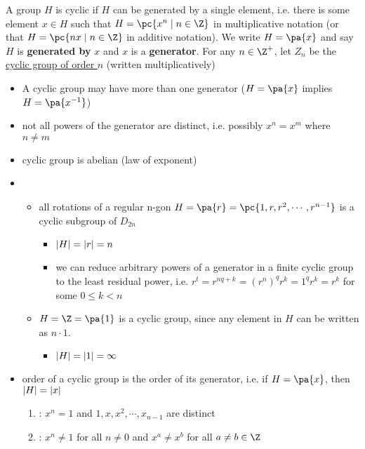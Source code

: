 \documentclass[11pt]{article}
\begin{document}
\begin{definition*}
     A group $H$ is cyclic if $H$ can be generated by a single element, i.e. there is some element $x\in H$ such that $H = \pc{x^n \mid n\in\Z}$ in multiplicative notation (or that $H=\pc{nx \mid n\in \Z}$ in additive notation). We write $H=\pa{x}$ and say $H$ is \textbf{generated by} $x$ and $x$ is a \textbf{generator}. For any $n\in\Z^+$, let $Z_n$ be the \underline{cyclic group of order $n$} (written multiplicatively)
    \begin{itemize}
        \item {} A cyclic group may have more than one generator ($H=\pa{x}$ implies $H=\pa{x^{-1}}$)
        \item {} not all powers of the generator are distinct, i.e. possibly $x^n = x^m$ where $n\neq m$
        \item {} cyclic group is abelian (law of exponent)
        \item {}
        \begin{itemize}
            \item all rotations of a regular n-gon $H=\pa{r} = \pc{1,r,r^2,\cdots,r^{n-1}}$ is a cyclic subgroup of $D_{2n}$ 
            \begin{itemize}
                \item $\left|H\right| = \left|r\right| = n$
                \item we can reduce arbitrary powers of a generator in a finite cyclic group to the least residual power, i.e. $r^t = r^{nq+k} = (r^n)^q r^k = 1^q r^k = r^k$ for some $0\leq k < n$
            \end{itemize}
            \item $H=\Z = \pa{1}$ is a cyclic group, since any element in $H$ can be written as $n\cdot 1$.
            \begin{itemize}
                \item $\left|H\right| = \left|1\right| = \infty$
            \end{itemize}
        \end{itemize}
        \item {} order of a cyclic group is the order of its generator, i.e. if $H=\pa{x}$, then $\left|H\right| = \left|x\right|$
        \begin{enumerate}
            \item {}: $x^n=1$ and $1,x,x^2,\cdots,x_{n-1}$ are distinct
            \item {}: $x^n \neq 1$ for all $n\neq 0$ and $x^a \neq x^b$ for all $a\neq b\in \Z$

\end{enumerate}
\end{itemize}
\end{definition*}
\end{document}
